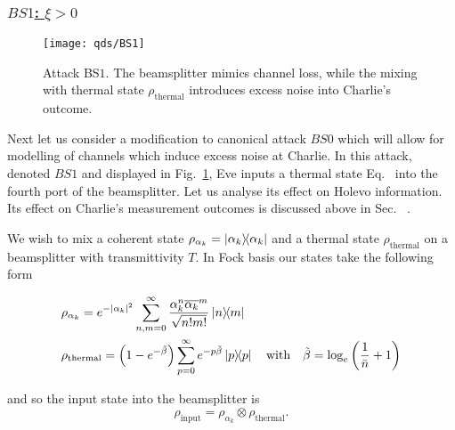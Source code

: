 \subsubsection{\underline{$BS1$: $\xi > 0$}}
\begin{figure}[htp]
\centering
\texttt{[image: qds/BS1]}
\caption{\label{fig:bs1_attack} Attack BS$1$. The beamsplitter mimics channel loss, while the mixing with thermal state $\rho_{\text{thermal}}$ introduces excess noise into Charlie's outcome.}
\end{figure}
Next let us consider a modification to canonical attack $BS0$ which will allow for modelling of channels which induce excess noise at Charlie. In this attack, denoted $BS1$ and displayed in Fig.~\ref{fig:bs1_attack}, Eve inputs a thermal state Eq.~ into the fourth port of the beamsplitter. Let us analyse its effect on Holevo information. Its effect on Charlie's measurement outcomes is discussed above in Sec.~ .

We wish to mix a coherent state $\rho_{\alpha_k} = \dyad{\alpha_k}$ and a thermal state $\rho_{\text{thermal}}$ on a beamsplitter with transmittivity $T$. In Fock basis our states take the following form

\begin{align}
&\rho_{\alpha_k} = e^{-\left|\alpha_k\right|^2} \sum_{n, m=0}^{\infty} \frac{\alpha_k^n \overline{\alpha_k}^{m}}{\sqrt{n! m!}} \dyad{n}{m} \notag \\
&\rho_{\text{thermal}} = \left(1 - e^{-\tilde{\beta}}\right) \sum_{p=0}^\infty e^{- p \tilde{\beta}}\dyad{p} \qq{with} \tilde{\beta} = \log_e\left(\frac{1}{\bar{n}} +1\right)
\end{align}

\noindent and so the input state into the beamsplitter is
\begin{equation}
\rho_{\text{input}} = \rho_{\alpha_k} \otimes \rho_{\text{thermal}}.
\end{equation}


